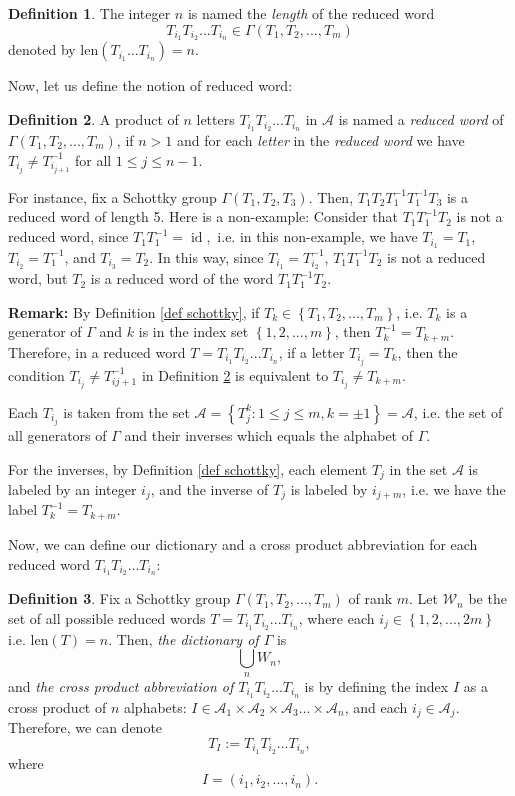 \documentclass[12pt,oneside]{sfsuthesis}
\theoremstyle{plain} %
\theoremstyle{definition}  %
\newtheorem{definition}{Definition}[chapter]
\theoremstyle{remark}  %
\theoremstyle{plain}
\DeclareMathOperator{\id}{id}
\begin{document}
{\begin{definition}
The integer $n$ is named the \textit{length} of the reduced word $$T_{i_1}T_{i_2}...T_{i_n}\in \Gamma(T_1,T_2,...,T_m)$$ denoted by $\text{len}(T_{i_1}...T_{i_n})= n$. 
\end{definition}

Now, let us define the notion of reduced word:
\begin{definition}\label{reduced word}
A product of $n$ letters $T_{i_1}T_{i_2}...T_{i_n}$ in $\mathcal{A}$ is named a \textit{reduced word} of $\Gamma(T_1,T_2,...,T_m)$, if $n>1$ and for each \textit{letter} in the \textit{reduced word} we have $T_{i_j}\neq T_{i_{j+1}}^{-1}$ for all $1\leq j \leq n-1$. 
\end{definition}

For instance, fix a Schottky group $\Gamma(T_1,T_2,T_3)$. Then, $T_1T_2T_1^{-1}T_1^{-1}T_3$ is a reduced word of length 5. Here is a non-example: Consider that $T_1T_1^{-1}T_2$ is not a reduced word, since $T_1T_1^{-1}=\id,$ i.e. in this non-example, we have $T_{i_1}=T_1$, $T_{i_2}=T_1^{-1}$, and $T_{i_3}=T_2$. In this way, since $T_{i_1}= T_{i_2}^{-1}$, $T_1T_1^{-1}T_2$ is not a reduced word, but $T_2$ is a reduced word of the word $T_1T_1^{-1}T_2$.

\textbf{Remark:} By Definition \ref{def schottky}, if $T_k \in \left\lbrace T_1,T_2,...,T_m\right\rbrace$, i.e. $T_k$ is a generator of $\Gamma$ and $k$ is in the index set $\left\lbrace 1,2,...,m\right\rbrace$, then $T_k^{-1}=T_{k+m}$. Therefore, in a reduced word $T=T_{i_1}T_{i_2}...T_{i_n}$, if a letter $T_{i_j}=T_k$, then the condition $T_{i_j}\neq T_{i{j+1}}^{-1}$ in Definition \ref{reduced word} is equivalent to $T_{i_j}\neq T_{k+m}$.

Each $T_{i_j}$ is taken from the set $\mathcal{A}=\left\lbrace T_j^k:1\leq j\leq m, k=\pm 1 \right\rbrace=\mathcal{A}$, i.e. the set of all generators of $\Gamma$ and their inverses which equals the alphabet of $\Gamma$. 

For the inverses, by Definition \ref{def schottky}, each element $T_j$ in the set $\mathcal{A}$ is labeled by an integer $i_j$, and the inverse of $T_j$ is labeled by $i_{j+m}$, i.e. we have the label $T_k^{-1}=T_{k+m}$. 

Now, we can define our dictionary and a cross product abbreviation for each reduced word $T_{i_1}T_{i_2}...T_{i_n}$:
\begin{definition}
Fix a Schottky group $\Gamma(T_1,T_2,...,T_m)$ of rank $m$. Let ${\mathcal W}_n$ be the set of all possible reduced words $T=T_{i_1}T_{i_2}...T_{i_n}$, where each $i_j\in\left\lbrace 1,2,...,2m\right\rbrace$ i.e. $\text{len}(T)=n$. Then, \textit{the dictionary of $\Gamma$} is 
$$
\bigcup\limits_{n}W_n,
$$
and \textit{the cross product abbreviation of $T_{i_1}T_{i_2}...T_{i_n}$} is by defining the index $I$ as a cross product of $n$ alphabets: $I\in \mathcal{A}_1\times\mathcal{A}_2\times\mathcal{A}_3...\times\mathcal{A}_n$, and each $i_j\in \mathcal{A}_j$. Therefore, we can denote $$T_I:=T_{i_1}T_{i_2}...T_{i_n},$$
where
$$
I=(i_1,i_2,...,i_n).
$$ 


\end{definition}}
\end{document}
